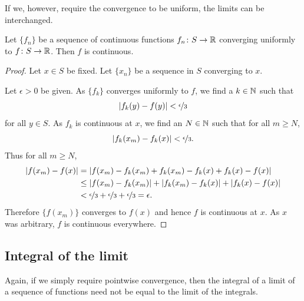 If we, however, require the convergence to be uniform, the limits can
be interchanged.

\begin{thm}
Let $\{ f_n \}$ be 
a sequence of continuous functions $f_n \colon S \to {\mathbb{R}}$ converging
uniformly to  $f \colon S \to {\mathbb{R}}$.  Then $f$ is continuous.
\end{thm}

\begin{proof}
Let $x \in S$ be fixed.  Let $\{ x_n \}$ be a sequence in $S$
converging to $x$.

Let $\epsilon > 0$ be given.
As $\{ f_k \}$ converges uniformly to $f$, we find a $k \in {\mathbb{N}}$ such that
\begin{equation*}
\left\lvert {f_k(y)-f(y)} \right\rvert < \nicefrac{\epsilon}{3}
\end{equation*}
for all $y \in S$.  As $f_k$ is continuous at $x$,
we find an $N \in {\mathbb{N}}$ such that for all $m \geq N$,
\begin{equation*}
\left\lvert {f_k(x_m)-f_k(x)} \right\rvert < \nicefrac{\epsilon}{3} .
\end{equation*}
Thus for all
$m \geq N$,
\begin{equation*}
\begin{split}
\left\lvert {f(x_m)-f(x)} \right\rvert
& =
\left\lvert {f(x_m)-f_k(x_m)+f_k(x_m)-f_k(x)+f_k(x)-f(x)} \right\rvert
\\
& \leq
\left\lvert {f(x_m)-f_k(x_m)} \right\rvert+
\left\lvert {f_k(x_m)-f_k(x)} \right\rvert+
\left\lvert {f_k(x)-f(x)} \right\rvert
\\
& <
\nicefrac{\epsilon}{3} +
\nicefrac{\epsilon}{3} +
\nicefrac{\epsilon}{3} = \epsilon .
\end{split}
\end{equation*}
Therefore $\bigl\{ f(x_m) \bigr\}$ converges to $f(x)$ and hence $f$ is continuous at
$x$.  As $x$ was arbitrary, $f$ is continuous everywhere.
\end{proof}

\subsection{Integral of the limit}

Again, if we simply require pointwise convergence, then the integral
of a limit of a sequence of functions need not be equal to the limit
of the integrals.

